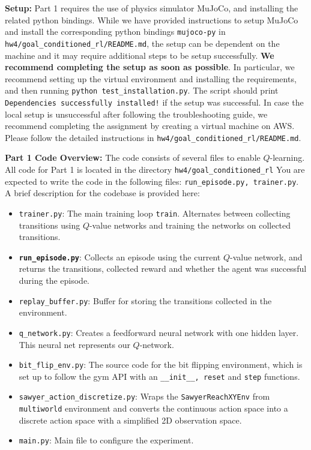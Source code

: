 \documentclass[12pt]{article}
\begin{document}
\textbf{Setup:} Part 1 requires the use of physics simulator MuJoCo, and installing the related python bindings. While we have provided instructions to setup MuJoCo and install the corresponding python bindings \texttt{mujoco-py} in \texttt{hw4/goal\_conditioned\_rl/README.md}, the setup can be dependent on the machine and it may require additional steps to be setup successfully. \textbf{We recommend completing the setup as soon as possible}. In particular, we recommend setting up the virtual environment and installing the requirements, and then running \texttt{python test\_installation.py}. The script should print \texttt{Dependencies successfully installed!} if the setup was successful. In case the local setup is unsuccessful after following the troubleshooting guide, we recommend completing the assignment by creating a virtual machine on AWS.  Please follow the detailed instructions in \texttt{hw4/goal\_conditioned\_rl/README.md}.

\textbf{Part 1 Code Overview:} The code consists of several files to enable $Q$-learning. All code for Part 1 is located in the directory \texttt{hw4/goal\_conditioned\_rl} You are expected to write the code in the following files: \texttt{run\_episode.py, trainer.py}. A brief description for the codebase is provided here:
\begin{itemize}
    \item \texttt{trainer.py}: The main training loop \texttt{train}. Alternates between collecting transitions using $Q$-value networks and training the networks on collected transitions.
    \item \textbf{\texttt{run\_episode.py}}: Collects an episode using the current $Q$-value network, and returns the transitions, collected reward and whether the agent was successful during the episode.
    \item \texttt{replay\_buffer.py}: Buffer for storing the transitions collected in the environment.
    \item \texttt{q\_network.py}: Creates a feedforward neural network with one hidden layer. This neural net represents our $Q$-network.
    \item\texttt{bit\_flip\_env.py}: The source code for the bit flipping environment, which is set up to follow the gym API with an \texttt{\_\_init\_\_, reset} and \texttt{step} functions.
    \item\texttt{sawyer\_action\_discretize.py}: Wraps the \texttt{SawyerReachXYEnv} from \texttt{multiworld} environment and converts the continuous action space into a discrete action space with a simplified 2D observation space.
    \item \texttt{main.py}: Main file to configure the experiment.
\end{itemize}
\end{document}
